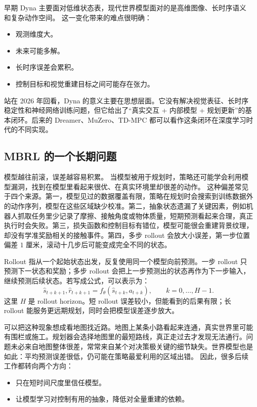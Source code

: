 \documentclass[11pt,a4paper]{ctexart}
\begin{document}
早期 Dyna 主要面对低维状态表，现代世界模型面对的是高维图像、长时序语义和复杂动作空间。
这一变化带来的难点很明确：

\begin{itemize}
  \item 观测维度大。
  \item 未来可能多解。
  \item 长时序误差会累积。
  \item 控制目标和视觉重建目标之间可能存在张力。
\end{itemize}

站在 2026 年回看，Dyna 的意义主要在思想层面。它没有解决视觉表征、长时序稳定性和神经网络训练问题，但它给出了“真实交互 + 内部模型 + 规划更新”的基本闭环。后来的 Dreamer、MuZero、TD-MPC 都可以看作这条闭环在深度学习时代的不同实现。

\subsection{MBRL 的一个长期问题}

模型越往前滚，误差越容易积累。
当模型被用于规划时，策略还可能学会利用模型漏洞，找到在模型里看起来很优、在真实环境里却很差的动作。
这种偏差常见于四个来源。第一，模型见过的数据覆盖有限，策略在规划时会搜索到训练数据外的动作序列，模型在这些区域缺少校准。第二，抽象状态遗漏了关键因素，例如机器人抓取任务里少记录了摩擦、接触角度或物体质量，短期预测看起来合理，真正执行时会失败。第三，损失函数和控制目标有错位，模型可能很会重建背景纹理，却没有学准奖励相关的接触事件。第四，多步 rollout 会放大小误差，第一步位置偏差 $1$ 厘米，滚动十几步后可能变成完全不同的状态。

Rollout 指从一个起始状态出发，反复使用同一个模型向前预测。一步 rollout 只预测下一状态和奖励；多步 rollout 会把上一步预测出的状态再作为下一步输入，继续预测后续状态。若写成公式，可以表示为：
\begin{equation}
  \hat{s}_{t+k+1},\hat{r}_{t+k+1}
  =
  f_\theta(\hat{s}_{t+k},a_{t+k}), \qquad k=0,\ldots,H-1 .
\end{equation}
这里 $H$ 是 rollout horizon。短 rollout 误差较小，但能看到的后果有限；长 rollout 能服务更远期规划，同时会把模型误差逐步放大。

可以把这种现象想成看地图找近路。地图上某条小路看起来连通，真实世界里可能有围栏或施工。规划器会选择地图里的最短路线，真正走过去才发现无法通行。问题未必来自地图整体很差，常常来自某个对决策极关键的细节缺失。世界模型也是如此：平均预测误差很低，仍可能在策略最爱利用的区域出错。
因此，很多后续工作都转向两个方向：

\begin{itemize}
  \item 只在短时间尺度里信任模型。
  \item 让模型学习对控制有用的抽象，降低对全量重建的依赖。
\end{itemize}
\end{document}
